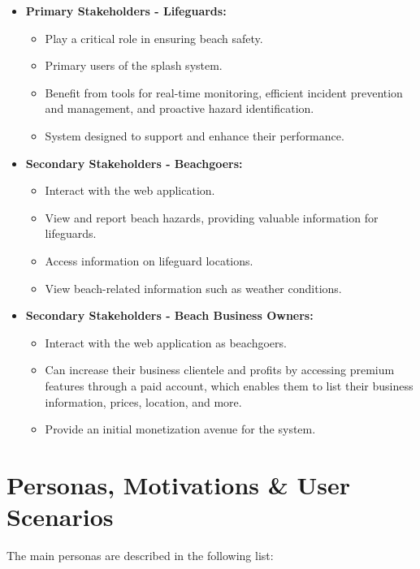 \begin{itemize}
    \item \textbf{Primary Stakeholders - Lifeguards:}
    \begin{itemize}
        \item Play a critical role in ensuring beach safety.
        \item Primary users of the \ac{splash} system.
        \item Benefit from tools for real-time monitoring, efficient incident prevention and management, and proactive hazard identification.
        \item System designed to support and enhance their performance.
    \end{itemize}

    \item \textbf{Secondary Stakeholders - Beachgoers:} 
    \begin{itemize}
        \item Interact with the web application.
        \item View and report beach hazards, providing valuable information for lifeguards.
        \item Access information on lifeguard locations.
        \item View beach-related information such as weather conditions.
    \end{itemize}

    \item \textbf{Secondary Stakeholders - Beach Business Owners:} 
    \begin{itemize}
        \item Interact with the web application as beachgoers.
        \item Can increase their business clientele and profits by accessing premium features through a paid account, which enables them to list their business information, prices, location, and more.
        \item Provide an initial monetization avenue for the system.
    \end{itemize}
\end{itemize}

\section{Personas, Motivations \& User Scenarios}
\label{section:personas}

The main personas are described in the following list:

